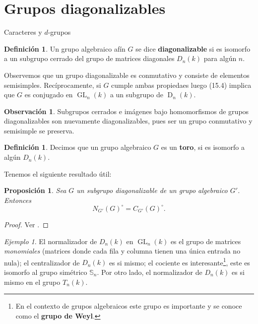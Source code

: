 \documentclass[spanish,10pt]{amsart}
\makeatletter
\renewcommand\subsection{\@startsection{subsection}{2}%
  \z@{.5\linespacing\@plus.7\linespacing}{-.5em}%
  {\normalfont\sffamily}}
\newtheorem{proposition}[theorem]{Proposición}
\theoremstyle{definition}
\newtheorem{definition}[theorem]{Definición}
\newtheorem{obs}[theorem]{Observación}
\theoremstyle{remark}
\newtheorem{example}[theorem]{Ejemplo}
\numberwithin{equation}{section}
\makeatother
\begin{document}
\section{Grupos diagonalizables}

\subsection{Caracteres y $d$-grupos}

\begin{definition}
Un grupo algebraico afín $G$ se dice \textbf{diagonalizable} si es isomorfo a un subgrupo cerrado del grupo de matrices diagonales $D_n (k)$ para algún $n$.
\end{definition}
Observemos que un grupo diagonalizable es conmutativo y consiste de elementos semisimples. Recíprocamente, si $G$ cumple ambas propiedaes luego (15.4) implica que $G$ es conjugado en $\operatorname{GL}_n (k)$ a un subgrupo de $\operatorname{D}_n (k)$.

\begin{obs}
Subgrupos cerrados e imágenes bajo homomorfismos de grupos diagonalizables son nuevamente diagonalizables, pues ser un grupo conmutativo y semisimple se preserva.
\end{obs}

\begin{definition}
Decimos que un grupo algebraico $G$ es un \textbf{toro}, si es isomorfo a algún $D_n (k)$.
\end{definition}


Tenemos el siguiente resultado útil:

\begin{proposition}\label{proposition:si G es un grupo diagonalizable de un grpo algebraico G' entonces la componente de la identidad de N_G' (G) es la componente de la identidad de C_G' (G)}
Sea $G$ un subgrupo diagonalizable de un grupo algebraico $G'$. Entonces
\[
    N_{G'} (G)^{\circ} = C_{G'} (G)^\circ.
\]
\end{proposition}
\begin{proof}
Ver \cite[Corolario 16.3]{humphreys2012linearAlgebraicGroups}.
\end{proof}

\begin{example}
El normalizador de $D_n (k)$ en $\operatorname{GL}_n (k)$ es el grupo de matrices \textit{monomiales} (matrices donde cada fila y columna tienen una única entrada no nula); el centralizador de $D_n (k)$ es si mismo; el cociente es interesante\footnote{En el contexto de grupos algebraicos este grupo es importante y se conoce como el \textbf{grupo de Weyl}.}, este es isomorfo al grupo simétrico $\mathbb{S}_n$. Por otro lado, el normalizador de $D_n (k)$ es si mismo en el grupo $T_n (k)$.
\end{example}
\end{document}
